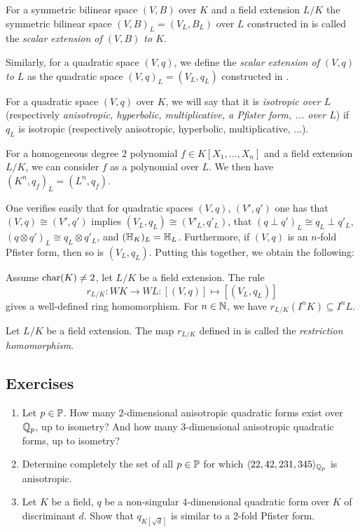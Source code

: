 \documentclass[12pt, leqno, british]{amsart}
\begin{document}
\begin{defi}\label{D:scalar-extension}
For a symmetric bilinear space $(V, B)$ over $K$ and a field extension $L/K$ the symmetric bilinear space $(V, B)_L = (V_L, B_L)$ over $L$ constructed in  is called the \emph{scalar extension of $(V, B)$ to $K$}.

Similarly, for a quadratic space $(V, q)$, we define the \emph{scalar extension of $(V, q)$ to $L$} as the quadratic space $(V, q)_L = (V_L, q_L)$ constructed in .

For a quadratic space $(V, q)$ over $K$, we will say that it is \emph{isotropic over $L$} (respectively \emph{anisotropic, hyperbolic, multiplicative, a Pfister form, ... over $L$}) if $q_L$ is isotropic (respectively anisotropic, hyperbolic, multiplicative, ...).
\end{defi}
\begin{rem}
For a homogeneous degree $2$ polynomial $f \in K[X_1, \ldots, X_n]$ and a field extension $L/K$, we can consider $f$ as a polynomial over $L$.
We then have $(K^n, q_f)_L = (L^n, q_f)$.
\end{rem}
One verifies easily that for quadratic spaces $(V, q)$, $(V', q')$ one has that $(V, q) \cong (V', q')$ implies $(V_L, q_L) \cong (V'_L, q'_L)$, that $(q \perp q')_L \cong q_L \perp q'_L$, $(q \otimes q')_L \cong q_L \otimes q'_L$, and $(\mathbb{H}_K)_L = \mathbb{H}_L$. Furthermore, if $(V, q)$ is an $n$-fold Pfister form, then so is $(V_L, q_L)$.
Putting this together, we obtain the following:
\begin{prop}\label{P:restriction-homomorphism}
Assume $\operatorname{char}(K) \neq 2$, let $L/K$ be a field extension.
The rule
$$ r_{L/K} : WK \to WL : [(V, q)] \mapsto [(V_L, q_L)] $$
gives a well-defined ring homomorphism.
For $n \in \mathbb N$, we have $r_{L/K}(I^n K) \subseteq I^nL$.
\end{prop}
\begin{defi}\label{D:restriction-homomorphism}
Let $L/K$ be a field extension.
The map $r_{L/K}$ defined in  is called the \emph{restriction homomorphism}.
\end{defi}

\subsection{Exercises}
\begin{enumerate}
\item Let $p \in \mathbb P$.
How many $2$-dimensional anisotropic quadratic forms exist over $\mathbb Q_p$, up to isometry?
And how many $3$-dimensional anisotropic quadratic forms, up to isometry?
\item Determine completely the set of all $p \in \mathbb P$ for which $\langle 22, 42, 231, 345 \rangle_{\mathbb Q_p}$ is anisotropic.
\item Let $K$ be a field, $q$ be a non-singular $4$-dimensional quadratic form over $K$ of discriminant $d$.
Show that $q_{K[\sqrt{d}]}$ is similar to a $2$-fold Pfister form.
\end{enumerate}
\end{document}
